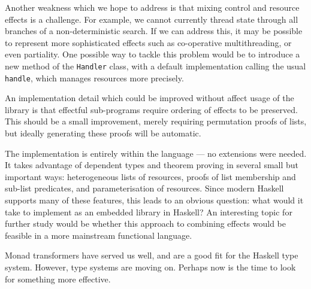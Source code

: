 Another weakness which we hope to address is that mixing
control and resource effects is a challenge. For example, we cannot
currently thread state through all branches of a non-deterministic search.
If we can address this, it may be possible to represent more sophisticated
effects such as co-operative multithreading, or even partiality.
One possible way to tackle this problem would be to introduce a new method
of the \texttt{Handler} class, with a default implementation calling the
usual \texttt{handle}, which manages resources more precisely.

An implementation detail which could be improved without affect usage of
the library is that effectful sub-programs require ordering of effects
to be preserved. This should be a small improvement, merely requiring permutation
proofs of lists, but ideally generating these proofs will be automatic.

The \Eff{} implementation is entirely within the \Idris{} language --- no
extensions were needed. It takes advantage of dependent types and theorem
proving in several small but important ways: heterogeneous lists of resources,
proofs of list membership and sub-list predicates, and parameterisation of
resources. Since modern Haskell supports many of these features, this leads
to an obvious question: what would it take to implement \Eff{} as an embedded
library in Haskell? An interesting topic for further study would be whether
this approach to combining effects would be feasible in a more mainstream
functional language.

Monad transformers have served us well, and are a good fit for the Haskell
type system. However, type systems are moving on. Perhaps now is the time to
look for something more effective.

